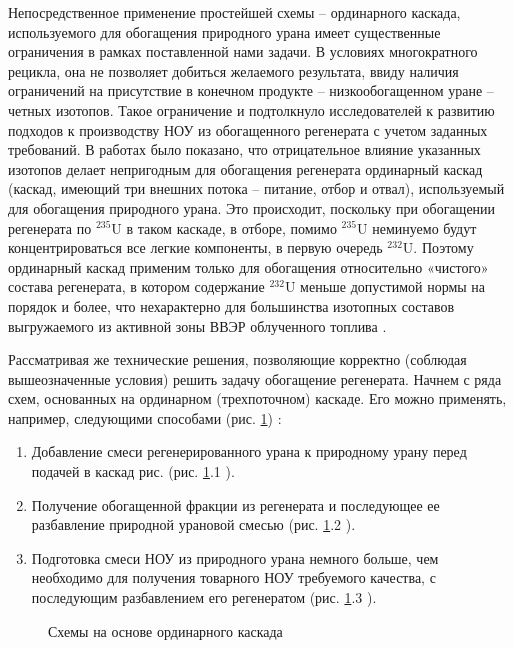 Непосредственное применение простейшей схемы -- ординарного каскада, используемого для обогащения природного урана имеет существенные ограничения в рамках поставленной нами задачи.
В условиях многократного рецикла, она не позволяет добиться желаемого результата, ввиду наличия ограничений на присутствие в конечном продукте -- низкообогащенном уране -- четных изотопов.
Такое ограничение и подтолкнуло исследователей к развитию подходов к производству НОУ из обогащенного регенерата с учетом заданных требований.
В работах \cite{sulaberidzeNekotoryhRazdelitelnyhProblemah2004,sulaberidzeProblemsRefinementRecycled4, smirnovKaskadnyeShemyZadachah2012} было показано, что отрицательное влияние указанных изотопов делает непригодным для обогащения регенерата ординарный каскад (каскад, имеющий три внешних потока – питание, отбор и отвал), используемый для обогащения природного урана. Это происходит, поскольку при обогащении регенерата по $^{235}$U в таком каскаде, в отборе, помимо $^{235}$U неминуемо будут концентрироваться все легкие компоненты, в первую очередь $^{232}$U. Поэтому ординарный каскад применим только для обогащения относительно «чистого» состава регенерата, в котором содержание $^{232}$U меньше допустимой нормы на порядок и более, что нехарактерно для большинства изотопных составов выгружаемого из активной зоны ВВЭР облученного топлива \cite{bormanTehnikoekonomicheskiyAnalizVozmozhnyh2012}.

Рассматривая же технические решения, позволяющие корректно (соблюдая вышеозначенные условия) решить задачу обогащение регенерата. Начнем с ряда схем, основанных на ординарном (трехпоточном) каскаде.
Его можно применять, например, следующими способами (рис. \ref{fig:diagram1}) \cite{smirnovKaskadnyeShemyZadachah2012}:
\begin{enumerate}
  \item Добавление смеси регенерированного урана к природному урану перед подачей в каскад рис. (рис. \ref{fig:diagram1}.1 ).
  \item Получение обогащенной фракции из регенерата и последующее ее разбавление природной урановой смесью (рис. \ref{fig:diagram1}.2 ).
  \item Подготовка смеси НОУ из природного урана немного больше, чем необходимо для получения товарного НОУ требуемого качества, с последующим разбавлением его регенератом (рис. \ref{fig:diagram1}.3 ).
\end{enumerate}

\begin{figure}[ht]
  \caption{Схемы на основе ординарного каскада}\label{fig:diagram1}
\end{figure}

